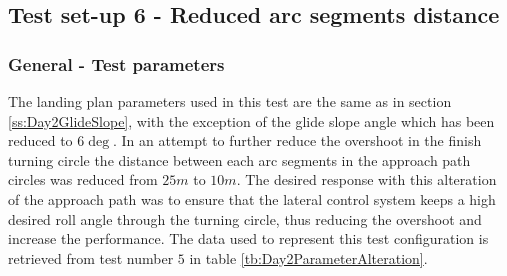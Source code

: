 %
\subsection{Test set-up 6 - Reduced arc segments distance}\label{ss:Day2ArcDistance}
\subsubsection{General - Test parameters}
The landing plan parameters used in this test are the same as in section \ref{ss:Day2GlideSlope}, with the exception of the glide slope angle which has been reduced to $6 \deg$. In an attempt to further reduce the overshoot in the finish turning circle the distance between each arc segments in the approach path circles was reduced from $25 m$ to $10 m$. The desired response with this alteration of the approach path was to ensure that the lateral control system keeps a high desired roll angle through the turning circle, thus reducing the overshoot and increase the performance. The data used to represent this test configuration is retrieved from test number $5$ in table \ref{tb:Day2ParameterAlteration}.
